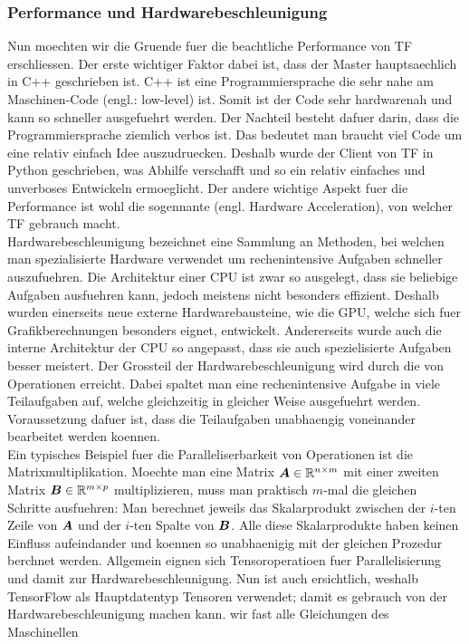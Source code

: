 \subsubsection{Performance und Hardwarebeschleunigung}
Nun moechten wir die Gruende fuer die beachtliche Performance von TF erschliessen.
Der erste wichtiger Faktor dabei ist, dass der Master hauptsaechlich in C++
geschrieben ist. C++ ist eine Programmiersprache die sehr nahe am Maschinen-Code
(engl.: low-level) ist. Somit ist der Code sehr hardwarenah und kann so
schneller ausgefuehrt werden. Der Nachteil besteht dafuer darin, dass die Programmiersprache
ziemlich verbos ist. Das bedeutet man braucht viel Code um eine relativ einfach Idee
auszudruecken. Deshalb wurde der Client von TF in Python geschrieben, was
Abhilfe verschafft und so ein relativ einfaches und unverboses Entwickeln ermoeglicht.
\para{}
Der andere wichtige Aspekt fuer die Performance ist wohl die sogennante
 (engl. Hardware Acceleration), von welcher TF
gebrauch macht. \\
Hardwarebeschleunigung bezeichnet eine Sammlung an Methoden,
bei welchen man spezialisierte Hardware verwendet um rechenintensive Aufgaben
schneller auszufuehren. Die Architektur einer CPU ist zwar so ausgelegt, dass
sie beliebige Aufgaben ausfuehren kann, jedoch meistens nicht besonders
effizient. Deshalb wurden einerseits neue externe Hardwarebausteine, wie die
GPU, welche sich fuer Grafikberechnungen besonders eignet, entwickelt.
Andererseits wurde auch die interne Architektur der CPU so angepasst, dass sie
auch spezielisierte Aufgaben besser meistert.
\para{}
Der Grossteil der Hardwarebeschleunigung wird durch die
 von Operationen erreicht. Dabei spaltet man eine
rechenintensive Aufgabe in viele Teilaufgaben auf, welche gleichzeitig in
gleicher Weise ausgefuehrt werden. Voraussetzung dafuer ist, dass die
Teilaufgaben unabhaengig voneinander bearbeitet werden koennen. \\
Ein typisches Beispiel fuer die Paralleliserbarkeit von Operationen ist die
Matrixmultiplikation. Moechte man eine Matrix $\bm{A} \in \mathbb{R}^{n \times m}$ mit
einer zweiten Matrix $\bm{B} \in \mathbb{R}^{m \times p}$ multiplizieren, muss man
praktisch $m$-mal die gleichen Schritte ausfuehren: Man berechnet jeweils das
Skalarprodukt zwischen der $i$-ten Zeile von $\bm{A}$ und der $i$-ten Spalte
von $\bm{B}$. Alle diese Skalarprodukte haben keinen Einfluss aufeindander und
koennen so unabhaenigig mit der gleichen Prozedur berchnet werden.
\para{}
Allgemein eignen sich Tensoroperatioen fuer Parallelisierung und damit zur Hardwarebeschleunigung.
Nun ist auch ersichtlich, weshalb TensorFlow als Hauptdatentyp Tensoren
verwendet; damit es gebrauch von der Hardwarebeschleunigung machen kann. wir fast alle Gleichungen des Maschinellen

